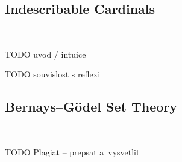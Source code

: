 \documentclass[12pt,a4paper]{article}
\newtheorem{definition}[theorem]{Definition}
\begin{document}
\subsection{Indescribable Cardinals}

\

{\color{red}
\begin{comment}

\begin{definition}[Indescribability]
For Q either $\Pi^m_n$ or $\Sigma^m_n$\newline
A cardinal $\kappa$ is \emph{$Q-indescribable$} if whenever
$U \subseteq V_\kappa$ and $\varphi$ is a~Q sentence such that $\langle V_\kappa, \in, U \rangle \models \varphi$, then for some $\alpha < \kappa$, $\langle V_\alpha, \in, U \cap V_\alpha \rangle \models \varphi$.
\end{definition}

\end{comment}
}

TODO uvod / intuice

TODO souvislost s reflexi


\subsection{Bernays–G{\"o}del Set Theory}

\

TODO Plagiat -- prepsat a~vysvetlit
\end{document}
